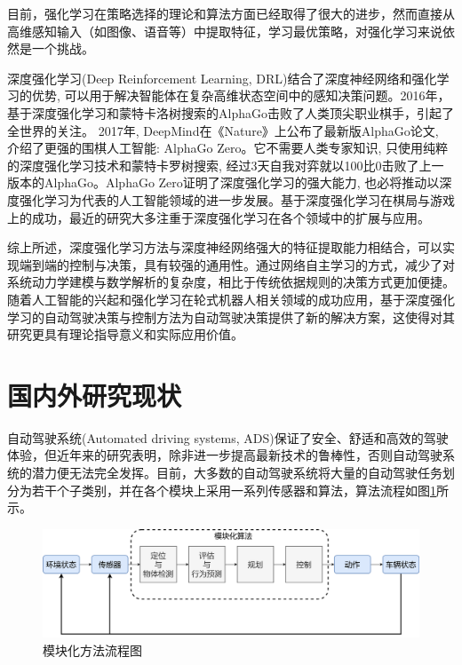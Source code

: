 目前，强化学习在策略选择的理论和算法方面已经取得了很大的进步，然而直接从高维感知输入（如图像、语音等）中提取特征，学习最优策略，对强化学习来说依然是一个挑战。

深度强化学习(Deep Reinforcement Learning, DRL)结合了深度神经网络和强化学习的优势, 可以用于解决智能体在复杂高维状态空间中的感知决策问题\cite{唐振韬2017深度强化学习进展}\cite{2017Deep}。2016年，基于深度强化学习和蒙特卡洛树搜索的AlphaGo击败了人类顶尖职业棋手，引起了全世界的关注\cite{2017Review}。 2017年, DeepMind在《Nature》上公布了最新版AlphaGo论文, 介绍了更强的围棋人工智能: AlphaGo Zero。它不需要人类专家知识, 只使用纯粹的深度强化学习技术和蒙特卡罗树搜索, 经过3天自我对弈就以100比0击败了上一版本的AlphaGo。AlphaGo Zero证明了深度强化学习的强大能力, 也必将推动以深度强化学习为代表的人工智能领域的进一步发展。基于深度强化学习在棋局与游戏上的成功，最近的研究大多注重于深度强化学习在各个领域中的扩展与应用。

综上所述，深度强化学习方法与深度神经网络强大的特征提取能力相结合，可以实现端到端的控制与决策，具有较强的通用性。通过网络自主学习的方式，减少了对系统动力学建模与数学解析的复杂度，相比于传统依据规则的决策方式更加便捷。随着人工智能的兴起和强化学习在轮式机器人相关领域的成功应用，基于深度强化学习的自动驾驶决策与控制方法为自动驾驶决策提供了新的解决方案，这使得对其研究更具有理论指导意义和实际应用价值。

\section{国内外研究现状} %

自动驾驶系统(Automated driving systems, ADS)保证了安全、舒适和高效的驾驶体验，但近年来的研究表明，除非进一步提高最新技术的鲁棒性，否则自动驾驶系统的潜力便无法完全发挥\cite{2019AutoDrive}。目前，大多数的自动驾驶系统将大量的自动驾驶任务划分为若干个子类别，并在各个模块上采用一系列传感器和算法，算法流程如图\ref{模块化方法流程图}所示。

\begin{figure}[htbp]
    \vspace{13pt} %
    \centering
    \includegraphics[width=1.0\textwidth]{images/chapter1/Autodrive_structure.png}
    \caption{模块化方法流程图}\label{模块化方法流程图} %
\end{figure}

